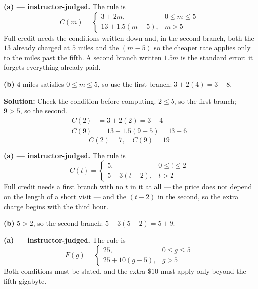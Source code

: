 \documentclass[12pt]{article}
\begin{document}




\textbf{(a) --- instructor-judged.} The rule is
\[ C(m) = \begin{cases} 3 + 2m, & 0 \le m \le 5 \\ 13 + 1.5(m-5), & m > 5 \end{cases} \]
Full credit needs the conditions written down and, in the second branch, both the $13$ already charged at $5$ miles and the $(m-5)$ so the cheaper rate applies only to the miles past the fifth. A second branch written $1.5m$ is the standard error: it forgets everything already paid.

\textbf{(b)} $4$ miles satisfies $0 \le m \le 5$, so use the first branch: $3 + 2(4) = 3 + 8$. 


\textbf{Solution:} Check the condition before computing. $2 \le 5$, so the first branch; $9 > 5$, so the second.
\begin{align*}
  C(2) &= 3 + 2(2) = 3 + 4 \\
  C(9) &= 13 + 1.5(9-5) = 13 + 6
\end{align*}
\[ \boxed{C(2) = 7, \quad C(9) = 19} \]


\textbf{(a) --- instructor-judged.} The rule is
\[ C(t) = \begin{cases} 5, & 0 \le t \le 2 \\ 5 + 3(t-2), & t > 2 \end{cases} \]
Full credit needs a first branch with no $t$ in it at all --- the price does not depend on the length of a short visit --- and the $(t-2)$ in the second, so the extra charge begins with the third hour.

\textbf{(b)} $5 > 2$, so the second branch: $5 + 3(5-2) = 5 + 9$. 


\textbf{(a) --- instructor-judged.} The rule is
\[ F(g) = \begin{cases} 25, & 0 \le g \le 5 \\ 25 + 10(g-5), & g > 5 \end{cases} \]
Both conditions must be stated, and the extra $\$10$ must apply only beyond the fifth gigabyte.
\end{document}
